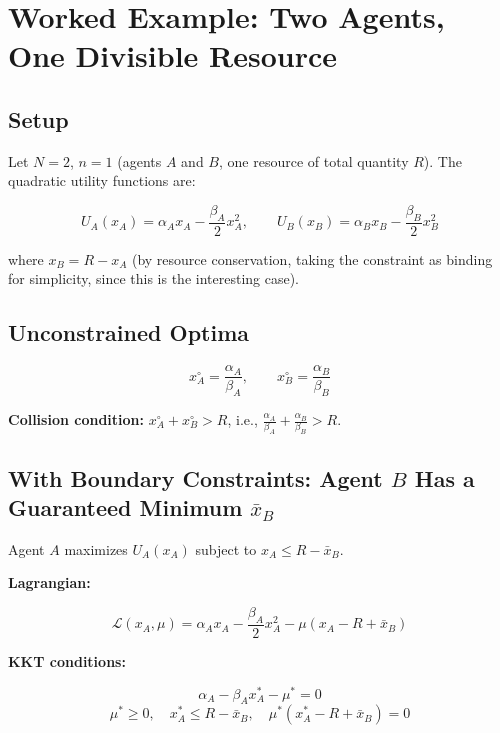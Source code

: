 \documentclass[11pt]{article}
\theoremstyle{plain}
\theoremstyle{definition}
\theoremstyle{remark}
\let\origsection\section
\renewcommand{\section}{\needspace{12\baselineskip}\origsection}
\let\origsubsection\subsection
\renewcommand{\subsection}{\needspace{7\baselineskip}\origsubsection}
\begin{document}
\section{Worked Example: Two Agents, One Divisible
Resource}\label{worked-example-two-agents-one-divisible-resource}

\subsection{Setup}\label{setup}

Let \(N = 2\), \(n = 1\) (agents \(A\) and \(B\), one resource of total
quantity \(R\)). The quadratic utility functions are:

\[U_A(x_A) = \alpha_A x_A - \frac{\beta_A}{2} x_A^2, \qquad U_B(x_B) = \alpha_B x_B - \frac{\beta_B}{2} x_B^2\]

where \(x_B = R - x_A\) (by resource conservation, taking the constraint
as binding for simplicity, since this is the interesting case).

\subsection{Unconstrained Optima}\label{unconstrained-optima}

\[x_A^{\circ} = \frac{\alpha_A}{\beta_A}, \qquad x_B^{\circ} = \frac{\alpha_B}{\beta_B}\]

\textbf{Collision condition:} \(x_A^{\circ} + x_B^{\circ} > R\), i.e.,
\(\frac{\alpha_A}{\beta_A} + \frac{\alpha_B}{\beta_B} > R\).

\subsection{\texorpdfstring{With Boundary Constraints: Agent \(B\) Has a
Guaranteed Minimum
\(\bar{x}_B\)}{With Boundary Constraints: Agent B Has a Guaranteed Minimum \textbackslash bar\{x\}\_B}}\label{with-boundary-constraints-agent-b-has-a-guaranteed-minimum-barx_b}

Agent \(A\) maximizes \(U_A(x_A)\) subject to
\(x_A \leq R - \bar{x}_B\).

\textbf{Lagrangian:}

\[\mathcal{L}(x_A, \mu) = \alpha_A x_A - \frac{\beta_A}{2} x_A^2 - \mu\left(x_A - R + \bar{x}_B\right)\]

\textbf{KKT conditions:}

\[\alpha_A - \beta_A x_A^* - \mu^* = 0\]
\[\mu^* \geq 0, \quad x_A^* \leq R - \bar{x}_B, \quad \mu^*(x_A^* - R + \bar{x}_B) = 0\]
\end{document}
